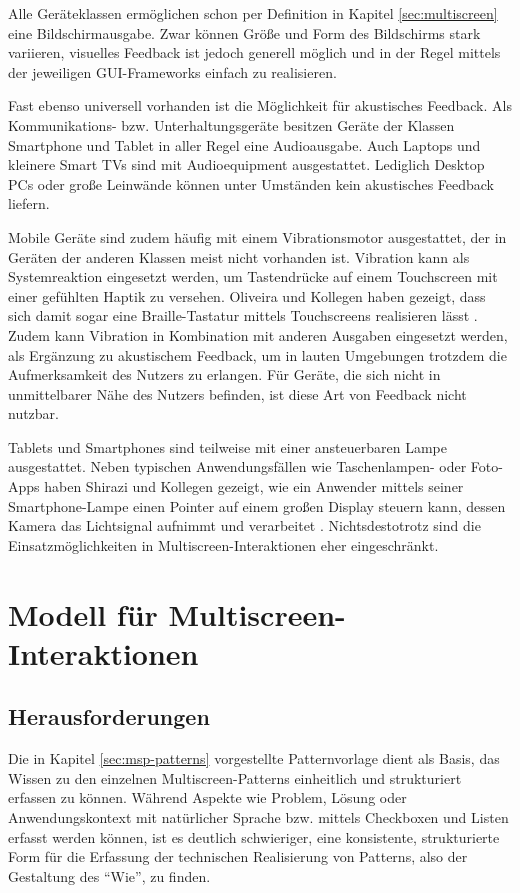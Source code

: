 Alle Geräteklassen ermöglichen schon per Definition in Kapitel \ref{sec:multiscreen} eine Bildschirmausgabe. Zwar können Größe und Form des Bildschirms stark variieren, visuelles Feedback ist jedoch generell möglich und in der Regel mittels der jeweiligen GUI-Frameworks einfach zu realisieren.

Fast ebenso universell vorhanden ist die Möglichkeit für akustisches Feedback.  Als Kommunikations- bzw. Unterhaltungsgeräte besitzen Geräte der Klassen Smartphone und Tablet in aller Regel eine Audioausgabe. Auch Laptops und kleinere Smart TVs sind mit Audioequipment ausgestattet. Lediglich Desktop PCs oder große Leinwände können unter Umständen kein akustisches Feedback liefern. 

Mobile Geräte sind zudem häufig mit einem Vibrationsmotor ausgestattet, der in Geräten der anderen Klassen meist nicht vorhanden ist. Vibration kann als Systemreaktion eingesetzt werden, um \zb Tastendrücke auf einem Touchscreen mit einer gefühlten Haptik zu versehen. Oliveira und Kollegen haben gezeigt, dass sich damit sogar eine Braille-Tastatur mittels Touchscreens realisieren lässt \citep{Oliveira2011}. Zudem kann Vibration in Kombination mit anderen Ausgaben eingesetzt werden, \zb als Ergänzung zu akustischem Feedback, um in lauten Umgebungen trotzdem die Aufmerksamkeit des Nutzers zu erlangen. Für Geräte, die sich nicht in unmittelbarer Nähe des Nutzers befinden, ist diese Art von Feedback nicht nutzbar.

Tablets und Smartphones sind teilweise mit einer ansteuerbaren Lampe ausgestattet. Neben typischen Anwendungsfällen wie Taschenlampen- oder Foto-Apps haben Shirazi und Kollegen 
gezeigt, wie ein Anwender mittels seiner Smartphone-Lampe einen Pointer auf einem großen Display steuern kann, dessen Kamera das Lichtsignal aufnimmt und verarbeitet \citep{Shirazi2009}. Nichtsdestotrotz sind die Einsatzmöglichkeiten in Multiscreen-Interaktionen eher eingeschränkt.

\chapter{Modell für Multiscreen-Interaktionen}
\label{ch:modell}
\section{Herausforderungen}
\label{sec:herausforderungen}
Die in Kapitel \ref{sec:msp-patterns} vorgestellte Patternvorlage dient als Basis, das Wissen zu den einzelnen Multiscreen-Patterns einheitlich und strukturiert erfassen zu können. Während Aspekte wie Problem, Lösung oder Anwendungskontext mit natürlicher Sprache bzw. mittels Checkboxen und Listen erfasst werden können, ist es deutlich schwieriger, eine konsistente, strukturierte Form für die Erfassung der technischen Realisierung von Patterns, also der Gestaltung des "`Wie"', zu finden.

